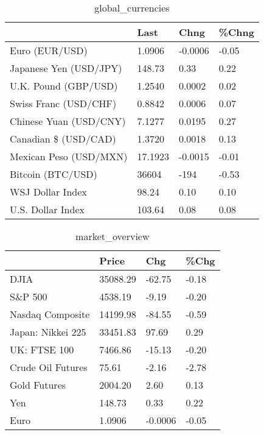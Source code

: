 \documentclass{article}%
\begin{document}
%


\begin{table}[htbp]%
\caption{global\_currencies}%
\centering%
\begin{adjustbox}{width=1\textwidth}%
\begin{tabular}{llll}
\toprule
                       &    Last &    Chng & \%Chng \\
\midrule
        Euro (EUR/USD) &  1.0906 & -0.0006 & -0.05 \\
Japanese Yen (USD/JPY) &  148.73 &    0.33 &  0.22 \\
  U.K. Pound (GBP/USD) &  1.2540 &  0.0002 &  0.02 \\
 Swiss Franc (USD/CHF) &  0.8842 &  0.0006 &  0.07 \\
Chinese Yuan (USD/CNY) &  7.1277 &  0.0195 &  0.27 \\
  Canadian \$ (USD/CAD) &  1.3720 &  0.0018 &  0.13 \\
Mexican Peso (USD/MXN) & 17.1923 & -0.0015 & -0.01 \\
     Bitcoin (BTC/USD) &   36604 &    -194 & -0.53 \\
      WSJ Dollar Index &   98.24 &    0.10 &  0.10 \\
     U.S. Dollar Index &  103.64 &    0.08 &  0.08 \\
\bottomrule
\end{tabular}
%
\end{adjustbox}%
\end{table}

%


\begin{table}[htbp]%
\caption{market\_overview}%
\centering%
\begin{adjustbox}{width=1\textwidth}%
\begin{tabular}{llll}
\toprule
                  &    Price &     Chg &  \%Chg \\
\midrule
             DJIA & 35088.29 &  -62.75 & -0.18 \\
          S\&P 500 &  4538.19 &   -9.19 & -0.20 \\
 Nasdaq Composite & 14199.98 &  -84.55 & -0.59 \\
Japan: Nikkei 225 & 33451.83 &   97.69 &  0.29 \\
     UK: FTSE 100 &  7466.86 &  -15.13 & -0.20 \\
Crude Oil Futures &    75.61 &   -2.16 & -2.78 \\
     Gold Futures &  2004.20 &    2.60 &  0.13 \\
              Yen &   148.73 &    0.33 &  0.22 \\
             Euro &   1.0906 & -0.0006 & -0.05 \\
\bottomrule
\end{tabular}
%
\end{adjustbox}%
\end{table}

%
\end{document}
